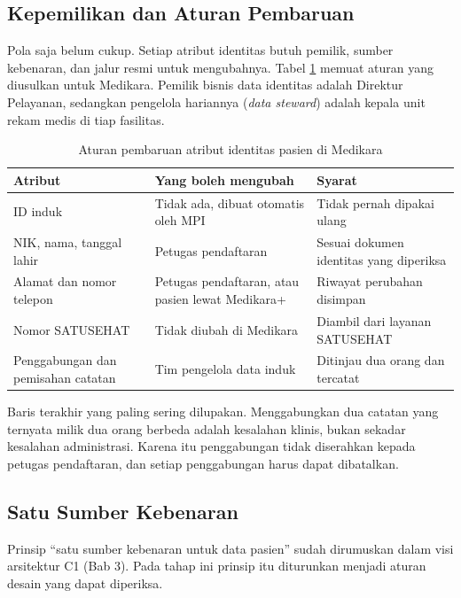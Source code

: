 \subsection*{Kepemilikan dan Aturan Pembaruan}

Pola saja belum cukup. Setiap atribut identitas butuh pemilik, sumber
kebenaran, dan jalur resmi untuk mengubahnya. Tabel
\ref{tab:ch09-aturan-identitas} memuat aturan yang diusulkan untuk Medikara.
Pemilik bisnis data identitas adalah Direktur Pelayanan, sedangkan
pengelola hariannya (\textit{data steward}) adalah kepala unit rekam medis di
tiap fasilitas.

\begin{table}[!htb]
  \centering
  \caption{Aturan pembaruan atribut identitas pasien di Medikara}
  \label{tab:ch09-aturan-identitas}
  \small
  \begin{tabularx}{\textwidth}{lXX}
    \hline
    \textbf{Atribut} & \textbf{Yang boleh mengubah} & \textbf{Syarat} \\
    \hline
    ID induk & Tidak ada, dibuat otomatis oleh MPI & Tidak pernah dipakai ulang \\
    \hline
    NIK, nama, tanggal lahir & Petugas pendaftaran & Sesuai dokumen identitas yang diperiksa \\
    \hline
    Alamat dan nomor telepon & Petugas pendaftaran, atau pasien lewat Medikara+ & Riwayat perubahan disimpan \\
    \hline
    Nomor SATUSEHAT & Tidak diubah di Medikara & Diambil dari layanan SATUSEHAT \\
    \hline
    Penggabungan dan pemisahan catatan & Tim pengelola data induk & Ditinjau dua orang dan tercatat \\
    \hline
  \end{tabularx}
\end{table}

Baris terakhir yang paling sering dilupakan. Menggabungkan dua catatan yang
ternyata milik dua orang berbeda adalah kesalahan klinis, bukan sekadar
kesalahan administrasi. Karena itu penggabungan tidak diserahkan kepada
petugas pendaftaran, dan setiap penggabungan harus dapat dibatalkan.

\subsection*{Satu Sumber Kebenaran}

Prinsip ``satu sumber kebenaran untuk data pasien'' sudah dirumuskan dalam
visi arsitektur C1 (Bab 3). Pada tahap ini prinsip itu diturunkan menjadi
aturan desain yang dapat diperiksa.

